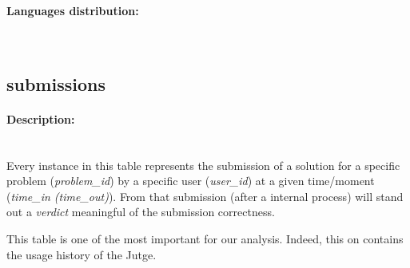 \documentclass[../main.tex]{subfiles}
\begin{document}
\paragraph{Languages distribution:}~\\ %

\newpage
\subsection{submissions} %
\label{sub:submissions}

\begin{figure}
  \vspace{-20pt}
  \begin{center}
  \end{center}
  \vspace{-20pt}
\end{figure}

\paragraph{Description:}~\\ %

Every instance in this table represents the submission of a solution for a specific problem (\emph{problem\_id}) by a specific user (\emph{user\_id}) at a given time/moment (\emph{time\_in (time\_out)}). From that submission (after a internal process) will stand out a \emph{verdict} meaningful of the submission correctness.

This table is one of the most important for our analysis. Indeed, this on contains the usage history of the Jutge.
\end{document}
